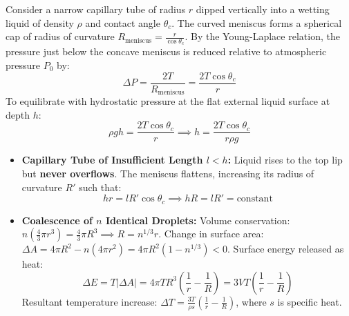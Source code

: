 \documentclass[10pt,twoside,openright]{book}
\begin{document}
\begin{formulabox}
Consider a narrow capillary tube of radius $r$ dipped vertically into a wetting liquid of density $\rho$ and contact angle $\theta_c$.
The curved meniscus forms a spherical cap of radius of curvature $R_{\text{meniscus}} = \frac{r}{\cos\theta_c}$.
By the Young-Laplace relation, the pressure just below the concave meniscus is reduced relative to atmospheric pressure $P_0$ by:
\begin{equation}
  \Delta P = \frac{2T}{R_{\text{meniscus}}} = \frac{2T\cos\theta_c}{r}
\end{equation}
To equilibrate with hydrostatic pressure at the flat external liquid surface at depth $h$:
\begin{equation}
  \rho g h = \frac{2T\cos\theta_c}{r} \implies h = \frac{2T\cos\theta_c}{r\rho g}
\end{equation}
\end{formulabox}

\begin{usecasebox}
\begin{itemize}
  \item \textbf{Capillary Tube of Insufficient Length $l < h$:} Liquid rises to the top lip but \textbf{never overflows}. The meniscus flattens, increasing its radius of curvature $R'$ such that:
  \begin{equation}
    h r = l R' \cos\theta_c \implies h R = l R' = \text{constant}
  \end{equation}
  \item \textbf{Coalescence of $n$ Identical Droplets:}
  Volume conservation: $n\left(\frac{4}{3}\pi r^3\right) = \frac{4}{3}\pi R^3 \implies R = n^{1/3}r$.
  Change in surface area: $\Delta A = 4\pi R^2 - n(4\pi r^2) = 4\pi R^2(1 - n^{1/3}) < 0$.
  Surface energy released as heat:
  \begin{equation}
    \Delta E = T|\Delta A| = 4\pi T R^3\left(\frac{1}{r} - \frac{1}{R}\right) = 3 V T\left(\frac{1}{r} - \frac{1}{R}\right)
  \end{equation}
  Resultant temperature increase: $\Delta T = \frac{3T}{\rho s}\left(\frac{1}{r} - \frac{1}{R}\right)$, where $s$ is specific heat.
\end{itemize}
\end{usecasebox}

\end{document}

